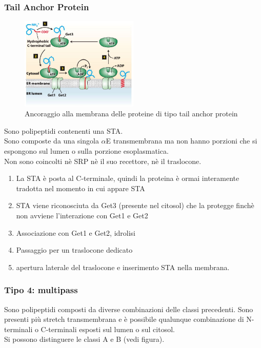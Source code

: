         \subsubsection{Tail Anchor Protein}
            \begin{figure}[h]
                \centering
                \includegraphics[width=0.5\textwidth]{images/TailAnchrProt.JPG}
                \caption{\small Ancoraggio alla membrana delle proteine di tipo tail anchor protein}
                \label{fig:mesh1}
            \end{figure}
            Sono polipeptidi contenenti una STA.\\
            Sono composte da una singola $\alpha$E transmembrana ma non hanno porzioni che si espongono sul lumen o sulla porzione esoplasmatica.\\
            Non sono coincolti nè SRP nè il suo recettore, nè il traslocone.
            \begin{enumerate}
                \item La STA è posta al C-terminale, quindi la proteina è ormai interamente tradotta nel momento in cui appare STA
                \item STA viene riconosciuta da Get3 (presente nel citosol) che la protegge finchè non avviene l'interazione con Get1 e Get2
                \item Associazione con Get1 e Get2, idrolisi
                \item Passaggio per un traslocone dedicato
                \item apertura laterale del traslocone e inserimento STA nella membrana.
            \end{enumerate}
            
        \subsubsection{Tipo 4: multipass}
            Sono polipeptidi composti da diverse combinazioni delle classi precedenti. Sono presenti più stretch transmembrana e è possibile qualunque combinazione di N-terminali o C-terminali esposti sul lumen o sul citosol.\\
            Si possono distinguere le classi A e B (vedi figura).
            
